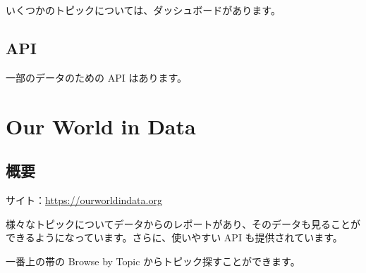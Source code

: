 \documentclass[
  xelatex, ja=standard]{bxjsbook}
\theoremstyle{definition}
\theoremstyle{definition}
\theoremstyle{definition}
\theoremstyle{definition}
\theoremstyle{remark}
\begin{document}
いくつかのトピックについては、ダッシュボードがあります。

\hypertarget{api-2}{%
\section{API}\label{api-2}}

一部のデータのための API はあります。

\hypertarget{owid-site}{%
\chapter{Our World in Data}\label{owid-site}}

\hypertarget{ux6982ux8981-5}{%
\section{概要}\label{ux6982ux8981-5}}

サイト：\url{https://ourworldindata.org}

様々なトピックについてデータからのレポートがあり、そのデータも見ることができるようになっています。さらに、使いやすい API も提供されています。

一番上の帯の Browse by Topic からトピック探すことができます。
\end{document}
